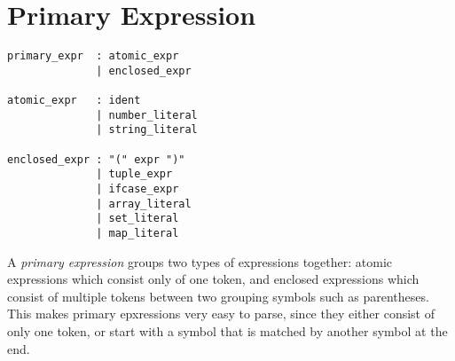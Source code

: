 \section{Primary Expression}

\begin{verbatim}
primary_expr  : atomic_expr
              | enclosed_expr

atomic_expr   : ident
              | number_literal
              | string_literal

enclosed_expr : "(" expr ")"
              | tuple_expr
              | ifcase_expr
              | array_literal
              | set_literal
              | map_literal
\end{verbatim}

A \emph{primary expression} groups two types of expressions together: atomic
expressions which consist only of one token, and enclosed expressions which
consist of multiple tokens between two grouping symbols such as parentheses.
This makes primary epxressions very easy to parse, since they either consist of
only one token, or start with a symbol that is matched by another symbol at the
end.
